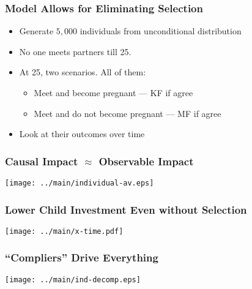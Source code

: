 \documentclass{beamer}
\begin{document}
\begin{frame}
\frametitle{Model Allows for Eliminating Selection}

\begin{itemize}
\item Generate $5{,}000$ individuals from unconditional distribution
\item No one meets partners till 25.
\item At 25, two scenarios. All of them:
\begin{itemize}
\item Meet and become pregnant --- KF if agree
\item Meet and do not become pregnant --- MF if agree
\end{itemize}
\item Look at their outcomes over time
\end{itemize}
\end{frame}

\begin{frame}
\frametitle{Causal Impact $\approx$ Observable Impact}
\begin{center}
\texttt{[image: ../main/individual-av.eps]}
\end{center}
\end{frame}



\begin{frame}
\frametitle{Lower Child Investment Even without Selection}
\vspace{-2cm}
\begin{center}
\texttt{[image: ../main/x-time.pdf]}
\end{center}
\end{frame}


\begin{frame}
\frametitle{``Compliers'' Drive Everything}
\begin{center}
\texttt{[image: ../main/ind-decomp.eps]}
\end{center}
\end{frame}
\end{document}
